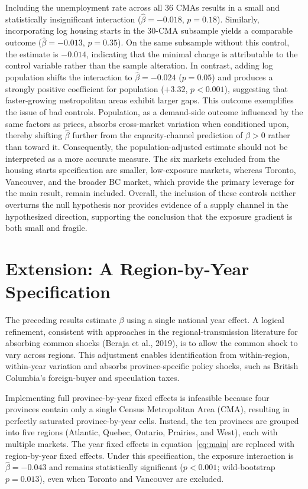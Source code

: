 \documentclass[12pt]{article}
\begin{document}
Including the unemployment rate across all 36 CMAs results in a small and statistically insignificant interaction ($\hat{\beta}=-0.018$, $p=0.18$). Similarly, incorporating log housing starts in the 30-CMA subsample yields a comparable outcome ($\hat{\beta}=-0.013$, $p=0.35$). On the same subsample without this control, the estimate is $-0.014$, indicating that the minimal change is attributable to the control variable rather than the sample alteration. In contrast, adding log population shifts the interaction to $\hat{\beta}=-0.024$ ($p=0.05$) and produces a strongly positive coefficient for population ($+3.32$, $p<0.001$), suggesting that faster-growing metropolitan areas exhibit larger gaps. This outcome exemplifies the issue of bad controls. Population, as a demand-side outcome influenced by the same factors as prices, absorbs cross-market variation when conditioned upon, thereby shifting $\hat{\beta}$ further from the capacity-channel prediction of $\beta>0$ rather than toward it. Consequently, the population-adjusted estimate should not be interpreted as a more accurate measure. The six markets excluded from the housing starts specification are smaller, low-exposure markets, whereas Toronto, Vancouver, and the broader BC market, which provide the primary leverage for the main result, remain included. Overall, the inclusion of these controls neither overturns the null hypothesis nor provides evidence of a supply channel in the hypothesized direction, supporting the conclusion that the exposure gradient is both small and fragile.


\section{Extension: A Region-by-Year Specification}
\label{sec:extension}

The preceding results estimate $\beta$ using a single national year effect. A logical refinement, consistent with approaches in the regional-transmission literature for absorbing common shocks (Beraja et al., 2019), is to allow the common shock to vary across regions. This adjustment enables identification from within-region, within-year variation and absorbs province-specific policy shocks, such as British Columbia's foreign-buyer and speculation taxes.

Implementing full province-by-year fixed effects is infeasible because four provinces contain only a single Census Metropolitan Area (CMA), resulting in perfectly saturated province-by-year cells. Instead, the ten provinces are grouped into five regions (Atlantic, Quebec, Ontario, Prairies, and West), each with multiple markets. The year fixed effects in equation~\eqref{eq:main} are replaced with region-by-year fixed effects. Under this specification, the exposure interaction is $\hat{\beta}=-0.043$ and remains statistically significant ($p<0.001$; wild-bootstrap $p=0.013$), even when Toronto and Vancouver are excluded.
\end{document}
